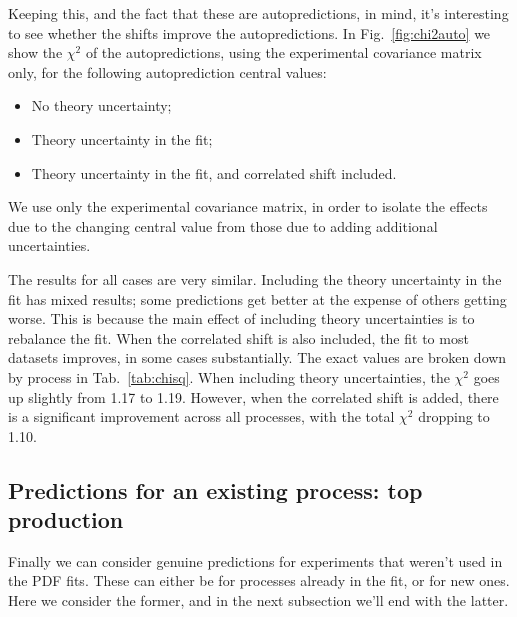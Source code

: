 Keeping this, and the fact that these are autopredictions, in mind, it's interesting to see whether the shifts improve the autopredictions. In Fig.~\ref{fig:chi2auto} we show the $\chi^2$ of the autopredictions, using the experimental covariance matrix only, for the following autoprediction central values:
\begin{itemize}
\item No theory uncertainty;
\item Theory uncertainty in the fit;
\item Theory uncertainty in the fit, and correlated shift included.
\end{itemize}
We use only the experimental covariance matrix, in order to isolate the effects due to the changing central value from those due to adding additional uncertainties. 

The results for all cases are very similar. Including the theory uncertainty in the fit has mixed results; some predictions get better at the expense of others getting worse. This is because the main effect of including theory uncertainties is to rebalance the fit. When the correlated shift is also included, the fit to most datasets improves, in some cases substantially. The exact values are broken down by process in Tab.~\ref{tab:chisq}. When including theory uncertainties, the $\chi^2$ goes up slightly from 1.17 to 1.19. However, when the correlated shift is added, there is a significant improvement across all processes, with the total $\chi^2$ dropping to 1.10.

\subsection{Predictions for an existing process: top production}
Finally we can consider genuine predictions for experiments that weren't used in the PDF fits. These can either be for processes already in the fit, or for new ones. Here we consider the former, and in the next subsection we'll end with the latter.

